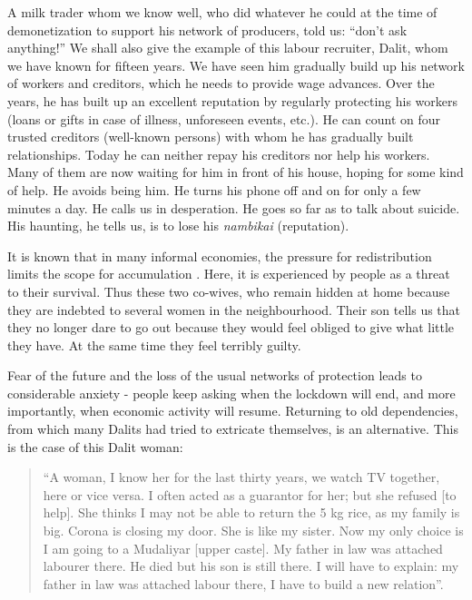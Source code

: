\documentclass[a4paper, 11pt, onecolumn]{article}
\begin{document}
A milk trader whom we know well, who did whatever he could at the time of demonetization to support his network of producers, told us: “don’t ask anything!” We shall also give the example of this labour recruiter, Dalit, whom we have known for fifteen years. We have seen him gradually build up his network of workers and creditors, which he needs to provide wage advances. Over the years, he has built up an excellent reputation by regularly protecting his workers (loans or gifts in case of illness, unforeseen events, etc.). He can count on four trusted creditors (well-known persons) with whom he has gradually built relationships. Today he can neither repay his creditors nor help his workers. Many of them are now waiting for him in front of his house, hoping for some kind of help. He avoids being him. He turns his phone off and on for only a few minutes a day.  He calls us in desperation. He goes so far as to talk about suicide. His haunting, he tells us, is to lose his \textit{nambikai} (reputation).

It is known that in many informal economies, the pressure for redistribution limits the scope for accumulation \citep{Platteau2015, Nguyen2017}. Here, it is experienced by people as a threat to their survival. Thus these two co-wives, who remain hidden at home because they are indebted to several women in the neighbourhood. Their son tells us that they no longer dare to go out because they would feel obliged to give what little they have. At the same time they feel terribly guilty.

Fear of the future and the loss of the usual networks of protection leads to considerable anxiety - people keep asking when the lockdown will end, and more importantly, when economic activity will resume. Returning to old dependencies, from which many Dalits had tried to extricate themselves, is an alternative. This is the case of this Dalit woman:

\begin{quote}
“A woman, I know her for the last thirty years, we watch TV together, here or vice versa. I often acted as a guarantor for her; but she refused [to help]. She thinks I may not be able to return the 5 kg rice, as my family is big. Corona is closing my door. She is like my sister. Now my only choice is I am going to a Mudaliyar [upper caste]. My father in law was attached labourer there. He died but his son is still there. I will have to explain: my father in law was attached labour there, I have to build a new relation”. 
\end{quote}
\end{document}
